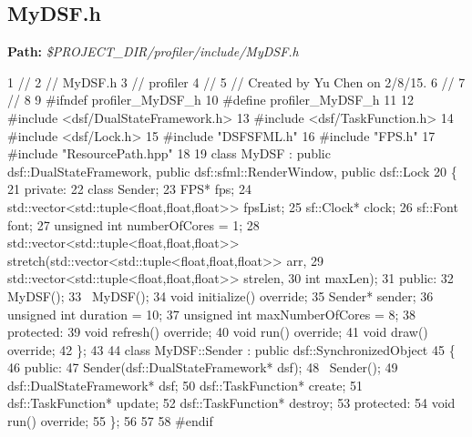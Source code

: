 \hypertarget{_benchmark_program_BenchmarkProgramMyDSF_h}{}\subsection{My\+D\+S\+F.\+h}\label{_benchmark_program_BenchmarkProgramMyDSF_h}
{\bfseries Path\+:} {\itshape \$\+P\+R\+O\+J\+E\+C\+T\+\_\+\+D\+I\+R/profiler/include/\+My\+D\+S\+F.h} 
\begin{DoxyCodeInclude}
1 \textcolor{comment}{//}
2 \textcolor{comment}{//  MyDSF.h}
3 \textcolor{comment}{//  profiler}
4 \textcolor{comment}{//}
5 \textcolor{comment}{//  Created by Yu Chen on 2/8/15.}
6 \textcolor{comment}{//}
7 \textcolor{comment}{//}
8 
9 \textcolor{preprocessor}{#ifndef profiler\_MyDSF\_h}
10 \textcolor{preprocessor}{#define profiler\_MyDSF\_h}
11 
12 \textcolor{preprocessor}{#include <dsf/DualStateFramework.h>}
13 \textcolor{preprocessor}{#include <dsf/TaskFunction.h>}
14 \textcolor{preprocessor}{#include <dsf/Lock.h>}
15 \textcolor{preprocessor}{#include "DSFSFML.h"}
16 \textcolor{preprocessor}{#include "FPS.h"}
17 \textcolor{preprocessor}{#include "ResourcePath.hpp"}
18 
19 \textcolor{keyword}{class }MyDSF : \textcolor{keyword}{public} dsf::DualStateFramework, \textcolor{keyword}{public} dsf::sfml::RenderWindow, \textcolor{keyword}{public} dsf::Lock
20 \{
21 \textcolor{keyword}{private}:
22     \textcolor{keyword}{class }Sender;
23     FPS* fps;
24     std::vector<std::tuple<float,float,float>> fpsList;
25     sf::Clock* clock;
26     sf::Font font;
27     \textcolor{keywordtype}{unsigned} \textcolor{keywordtype}{int} numberOfCores = 1;
28     std::vector<std::tuple<float,float,float>> stretch(std::vector<std::tuple<float,float,float>> arr,
29                                                        std::vector<std::tuple<float,float,float>> strelen,
30                                                        \textcolor{keywordtype}{int} maxLen);
31 \textcolor{keyword}{public}:
32     MyDSF();
33     ~MyDSF();
34     \textcolor{keywordtype}{void} initialize() \textcolor{keyword}{override};
35     Sender* sender;
36     \textcolor{keywordtype}{unsigned} \textcolor{keywordtype}{int} duration = 10;
37     \textcolor{keywordtype}{unsigned} \textcolor{keywordtype}{int} maxNumberOfCores = 8;
38 \textcolor{keyword}{protected}:
39     \textcolor{keywordtype}{void} refresh() \textcolor{keyword}{override};
40     \textcolor{keywordtype}{void} run() \textcolor{keyword}{override};
41     \textcolor{keywordtype}{void} draw() \textcolor{keyword}{override};
42 \};
43 
44 \textcolor{keyword}{class }MyDSF::Sender : \textcolor{keyword}{public} dsf::SynchronizedObject
45 \{
46 \textcolor{keyword}{public}:
47     Sender(dsf::DualStateFramework* dsf);
48     ~Sender();
49     dsf::DualStateFramework* dsf;
50     dsf::TaskFunction* create;
51     dsf::TaskFunction* update;
52     dsf::TaskFunction* destroy;
53 \textcolor{keyword}{protected}:
54     \textcolor{keywordtype}{void} run() \textcolor{keyword}{override};
55 \};
56 
57 
58 \textcolor{preprocessor}{#endif}
\end{DoxyCodeInclude}
